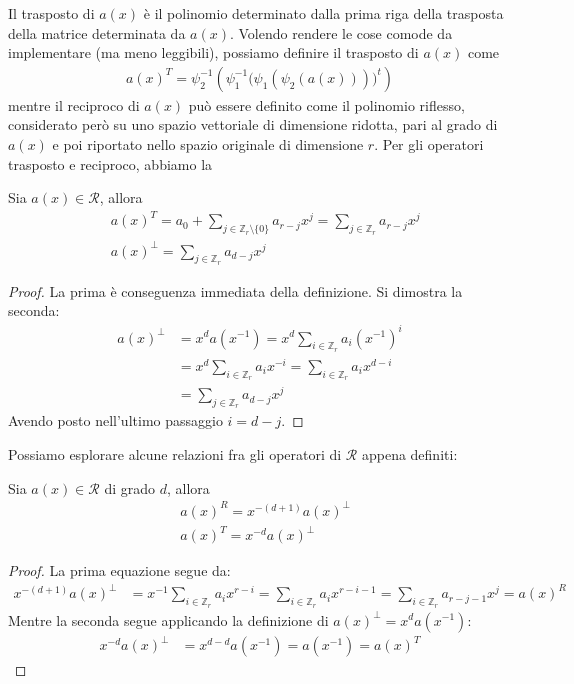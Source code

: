 \noindent
Il trasposto di $a(x)$ è il polinomio determinato dalla prima riga della trasposta della matrice determinata da $a(x)$. Volendo rendere le cose comode da implementare (ma meno leggibili), possiamo definire il trasposto di $a(x)$ come
\begin{align*}
   a(x)^{T} = \psi_{2}^{-1} ( \psi_{1}^{-1} \Big( \psi_{1} ( \psi_{2}(a(x))) \Big)^{t}    )
\end{align*}
mentre il reciproco di $a(x)$ può essere definito come il polinomio riflesso, considerato però su uno spazio vettoriale di dimensione ridotta, pari al grado di $a(x)$ e poi riportato nello spazio originale di dimensione $r$. Per gli operatori trasposto e reciproco, abbiamo la
\begin{prop}
   Sia $a(x) \in \mathcal{R}$, allora
   \begin{align*}
     & a(x)^{T} = a_{0} + \sum_{j \in \mathbb{Z}_{r} \setminus \lbrace 0 \rbrace } a_{r-j} x^j
                 = \sum_{j \in \mathbb{Z}_{r} } a_{r-j} x^j \\
     & a(x)^{\perp} = \sum_{j \in \mathbb{Z}_{r}} a_{d-j}x^{j}
   \end{align*}
\end{prop}
\begin{proof}
   La prima è conseguenza immediata della definizione. Si dimostra la seconda:
   \begin{align*}
     a(x)^{\perp}  &=  x^d a(x^{-1}) =  x^d \sum_{i \in \mathbb{Z}_{r}} a_{i}(x^{-1})^{i} \\
       &= x^d \sum_{i \in \mathbb{Z}_{r}} a_{i}x^{-i} = \sum_{i \in \mathbb{Z}_{r}} a_{i}x^{d-i}  \\
       &= \sum_{j \in \mathbb{Z}_{r}} a_{d-j}x^{j}
   \end{align*}
   Avendo posto nell'ultimo passaggio $i=d-j$.
\end{proof}
\noindent
Possiamo esplorare alcune relazioni fra gli operatori di $\mathcal{R}$ appena definiti:
\begin{prop}
  Sia $a(x) \in \mathcal{R}$ di grado $d$, allora
  \begin{align*}
     & a(x)^{R} = x^{-(d+1)} a(x)^{\perp} \\
     & a(x)^{T} = x^{-d} a(x)^{\perp}
   \end{align*}
\end{prop}
\begin{proof}
   La prima equazione segue da:
   \begin{align*}
     x^{-(d+1)}a(x)^{\perp}  &= x^{-1} \sum_{i \in \mathbb{Z}_{r}} a_{i}x^{r-i} = \sum_{i \in \mathbb{Z}_{r}} a_{i}x^{r-i-1} = \sum_{i \in \mathbb{Z}_{r}} a_{r-j-1}x^{j}  = a(x)^{R}
   \end{align*}
   Mentre la seconda segue applicando la definizione di $a(x)^{\perp} =  x^d a(x^{-1}) $:
   \begin{align*}
     x^{-d} a(x)^{\perp}  &= x^{d-d}  a(x^{-1}) = a(x^{-1}) = a(x)^{T}
   \end{align*}
\end{proof}
